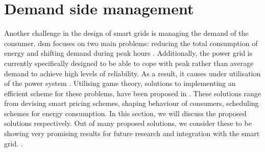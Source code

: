 \section{Demand side management}
Another challenge in the design of smart grids is managing the demand of the consumer. \ac{dsm} focuses on two main problems: reducing the total consumption of energy and shifting demand during peak hours \cite{keypaper}. Additionally, the power grid is currently specifically designed to be able to cope with peak rather than average demand to achieve high levels of reliability. As a result, it causes under utilisation of the power system \cite{MaDengSongEtAl2014}. Utilising game theory, solutions to implementing an efficient scheme for these problems, have been proposed in \cite{SamadiMohsenian-RadSchoberEtAl2012, SamadiSchoberWong2011, MaDengSongEtAl2014, MaharjanZhuZhangEtAl2013, ChenKishoreSnyder2011, ChenLiLowEtAl2010, Mohsenian-RadWongJatskevichEtAl2010a, SalinasLiLi2013, CaronKesidis2010, DepuruWangDevabhaktuni2011a}. These solutions range from devising smart pricing schemes, shaping behaviour of consumers, scheduling schemes for energy consumption. In this section, we will discuss the proposed solutions respectively. Out of many proposed solutions, we consider these to be showing very promising results for future research and integration with the smart grid. .

